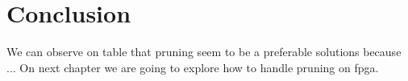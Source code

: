 \section{Conclusion} \label{sec:cclopti}
We can observe on table that pruning seem to be a preferable solutions because ... \newline \newline
On next chapter we are going to explore how to handle pruning on \acrshort{fpga}.
